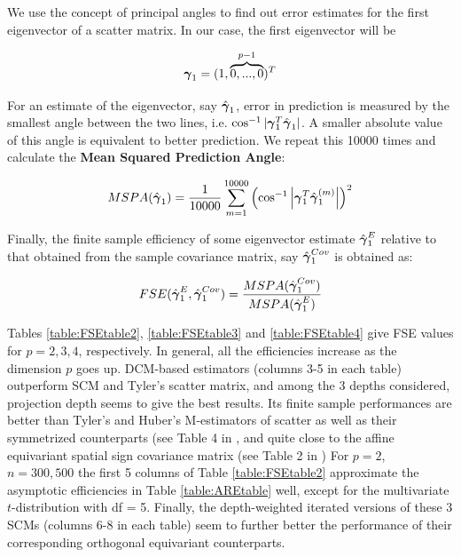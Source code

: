 \documentclass[fleqn,11pt]{article}
\begin{document}
We use the concept of principal angles \citep{miao92} to find out error estimates for the first eigenvector of a scatter matrix. In our case, the first eigenvector will be

$$ {\boldsymbol{\gamma}}_1 = (1,\overbrace{0,...,0}^{p-1})^T $$

For an estimate of the eigenvector, say $\hat{{\boldsymbol{\gamma}}}_1$, error in prediction is measured by the smallest angle between the two lines, i.e. $ \cos^{-1} | {\boldsymbol{\gamma}}_1^T \hat{{\boldsymbol{\gamma}}}_1 | $. A smaller absolute value of this angle is equivalent to better prediction. We repeat this 10000 times and calculate the \textbf{Mean Squared Prediction Angle}:

$$ MSPA(\hat {{\boldsymbol{\gamma}}}_1) = \frac{1}{10000} \sum_{m=1}^{10000} \left( \cos^{-1} \left|{\boldsymbol{\gamma}}_1^T \hat{{\boldsymbol{\gamma}}}^{(m)}_1 \right| \right)^2 $$

Finally, the finite sample efficiency of some eigenvector estimate $\hat{{\boldsymbol{\gamma}}}^E_1$ relative to that obtained from the sample covariance matrix, say $\hat{{\boldsymbol{\gamma}}}^{Cov}_1$ is obtained as:

$$ FSE(\hat{{\boldsymbol{\gamma}}}^E_1, \hat{{\boldsymbol{\gamma}}}^{Cov}_1) = \frac{MSPA(\hat{{\boldsymbol{\gamma}}}^{Cov}_1)}{MSPA(\hat{{\boldsymbol{\gamma}}}^E_1)} $$

Tables \ref{table:FSEtable2}, \ref{table:FSEtable3} and \ref{table:FSEtable4} give FSE values for $p=2,3,4$, respectively. In general, all the efficiencies increase as the dimension $p$ goes up. DCM-based estimators (columns 3-5 in each table) outperform SCM and Tyler's scatter matrix, and among the 3 depths considered, projection depth seems to give the best results. Its finite sample performances are better than Tyler's and Huber's M-estimators of scatter as well as their symmetrized counterparts (see Table 4 in \cite{sirkia07}, and quite close to the affine equivariant spatial sign covariance matrix (see Table 2 in \cite{ollilia03}) For $p=2$, $n=300, 500$ the first 5 columns of Table \ref{table:FSEtable2} approximate the asymptotic efficiencies in Table \ref{table:AREtable} well, except for the multivariate $t$-distribution with df = 5. Finally, the depth-weighted iterated versions of these 3 SCMs (columns 6-8 in each table) seem to further better the performance of their corresponding orthogonal equivariant counterparts.
\end{document}
